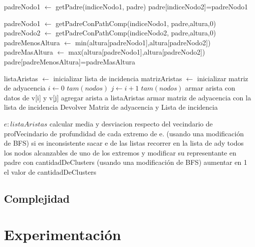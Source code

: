 \documentclass[8pt,a4paper]{article}
\begin{document}
\begin{codebox}
\li padreNodo1 $\gets$ getPadre(indiceNodo1, padre)
\li padre[indiceNodo2]=padreNodo1
\end{codebox}

\begin{codebox}
\li padreNodo1 $\gets$ getPadreConPathComp(indiceNodo1, padre,altura,0)
\li padreNodo2 $\gets$ getPadreConPathComp(indiceNodo2, padre,altura,0)
\li padreMenosAltura $\gets$ min(altura[padreNodo1],altura[padreNodo2])
\li padreMasAltura $\gets$ max(altura[padreNodo1],altura[padreNodo2])
\li padre[padreMenosAltura]=padreMasAltura
\end{codebox}


\begin{codebox}
\li listaAristas $\gets$ inicializar lista de incidencia
\li matrizAristas $\gets$ inicializar matriz de adyacencia
\li \For $i \gets 0$ \To $tam(nodos)$
\li 	\For  $j \gets i+1$ \To $tam(nodos)$
			\li armar arista con datos de v[i] y v[j]
			\li agregar arista a listaAristas
		\End
	\End
\li armar matriz de adyacencia con la lista de incidencia
\li Devolver Matriz de adyacencia y Lista de incidencia
\end{codebox}

\begin{codebox}
\li \For $e:listaAristas$
\li calcular media y desviacion respecto del vecindario de profVecindario de profundidad de cada extremo de e. (usando una modificación de BFS)
\li si es inconsistente
\li sacar e de las listas
\li recorrer en la lista de ady todos los nodos alcanzables de uno de los extremos y modificar su representante en padre con cantidadDeClusters (usando una modificación de BFS)
\li aumentar en 1 el valor de cantidadDeClusters

\li \End
\end{codebox}


\subsection{Complejidad}

\section{Experimentación}
\end{document}
